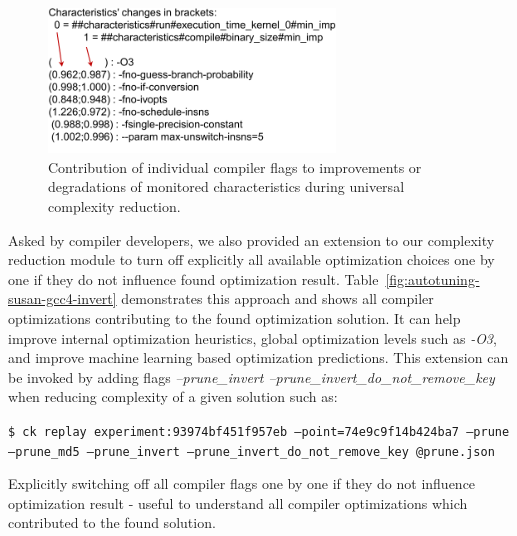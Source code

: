    \begin{figure}[]
     \centering
      \includegraphics[width=3.0in]
      {ck-assets/a472d964631c80a2-cropped.pdf} %
     \caption{
       Contribution of individual compiler flags to improvements or degradations of monitored characteristics during universal complexity reduction.
     }
     \label{fig:ck-pruning-contribution}
   \end{figure}

Asked by compiler developers, we also provided an extension to our complexity reduction module 
to turn off explicitly all available optimization choices one by one
if they do not influence found optimization result.
%
Table~\ref{fig:autotuning-susan-gcc4-invert} demonstrates this approach and shows all compiler optimizations contributing to the found optimization solution.
%
It can help improve internal optimization heuristics, global optimization levels such as \textit{-O3},
and improve machine learning based optimization predictions.
%
This extension can be invoked by adding flags \textit{--prune\_invert --prune\_invert\_do\_not\_remove\_key}
when reducing complexity of a given solution such as:
\begin{flushleft}
\texttt{\$ ck replay experiment:93974bf451f957eb --point=74e9c9f14b424ba7 --prune --prune\_md5 --prune\_invert --prune\_invert\_do\_not\_remove\_key @prune.json}
\end{flushleft}

  \begin{table}[]
   \centering
   \caption{
     Explicitly switching off all compiler flags one by one if they do not influence optimization result - 
     useful to understand all compiler optimizations which contributed to the found solution. 
   }
   \label{fig:autotuning-susan-gcc4-invert}
  \end{table}

